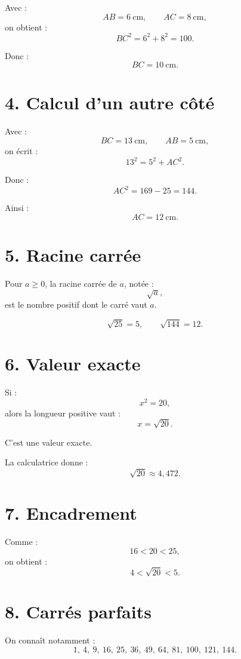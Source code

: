 Avec :
\[
AB=6\ \text{cm},\qquad AC=8\ \text{cm},
\]
on obtient :
\[
BC^2=6^2+8^2=100.
\]

Donc :
\[
\boxed{BC=10\ \text{cm}}.
\]

\section{4. Calcul d'un autre côté}

Avec :
\[
BC=13\ \text{cm},\qquad AB=5\ \text{cm},
\]
on écrit :
\[
13^2=5^2+AC^2.
\]

Donc :
\[
AC^2=169-25=144.
\]

Ainsi :
\[
\boxed{AC=12\ \text{cm}}.
\]

\section{5. Racine carrée}

\begin{definition}
Pour $a\ge0$, la racine carrée de $a$, notée :
\[
\sqrt a,
\]
est le nombre positif dont le carré vaut $a$.
\end{definition}

\[
\sqrt{25}=5,\qquad \sqrt{144}=12.
\]

\section{6. Valeur exacte}

Si :
\[
x^2=20,
\]
alors la longueur positive vaut :
\[
\boxed{x=\sqrt{20}}.
\]

C'est une valeur exacte.

La calculatrice donne :
\[
\sqrt{20}\approx4{,}472.
\]

\section{7. Encadrement}


Comme :
\[
16<20<25,
\]
on obtient :
\[
4<\sqrt{20}<5.
\]

\section{8. Carrés parfaits}

On connaît notamment :
\[
1,\ 4,\ 9,\ 16,\ 25,\ 36,\ 49,\ 64,\ 81,\ 100,\ 121,\ 144.
\]

